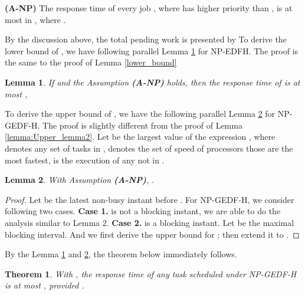 \documentclass[Times, 10pt,twocolumn]{article}
\newtheorem{theorem}{\textbf{Theorem}}
\newtheorem{lemma}{\textbf{Lemma}}
\theoremstyle{definition}
\begin{document}
\textbf{(A-NP)} The response time of every job , where  has higher priority than , is at most  in , where .

By the discussion above, the total pending work is presented by 
 \vspace{-1mm}
To derive the lower bound of , we have following parallel Lemma \ref{lemma:NP-Lower_lemma} for NP-EDFH. The proof is the same to the proof of Lemma \ref{lower_bound}

\begin{lemma}
\label{lemma:NP-Lower_lemma}
If  and the Assumption \textbf{(A-NP)} holds, then the response time of  is at most ,
\end{lemma}


To derive the upper bound of , we have the following parallel Lemma \ref{lemma:NP-upper_lemma} for NP-GEDF-H. The proof is slightly different from the proof of Lemma \ref{lemma:Upper_lemma2}. Let  be the largest value of the expression , where  denotes any set of  tasks in ,  denotes the set of speed of  processors those are the most  fastest,  is the execution of any  not in .

\begin{lemma}
\label{lemma:NP-upper_lemma}
With Assumption \textbf{(A-NP)}, . 
\end{lemma}
\begin{proof}
Let  be the latest non-busy instant before . For NP-GEDF-H, we consider following two cases. \textbf{Case 1.}  is not a blocking instant, we are able to do the analysis similar to Lemma 2. \textbf{Case 2.}  is a blocking instant. Let  be the maximal blocking interval. And we first derive the upper bound for ; then extend it to .
\end{proof}


\vspace{-1mm}
By the Lemma \ref{lemma:NP-Lower_lemma} and \ref{lemma:NP-upper_lemma}, the theorem below immediately follows.
\vspace{-1mm}

\begin{theorem}
\label{theorem:NPSRTtest}
With , the response time of any task  scheduled under NP-GEDF-H is at most , provided .
\end{theorem}
\end{document}
